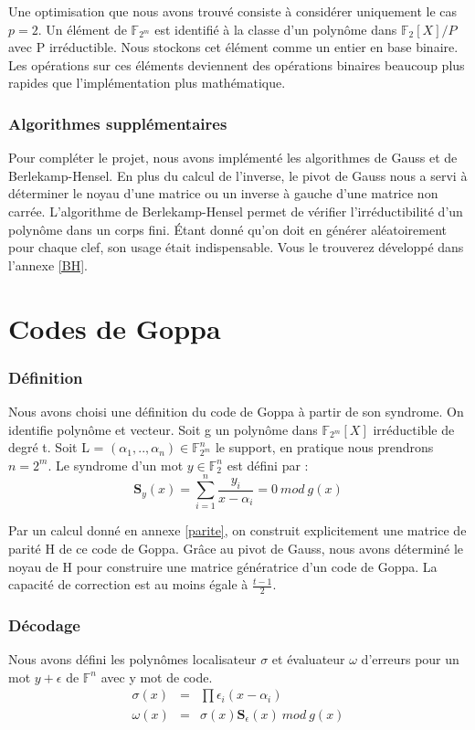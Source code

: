 \documentclass{article}
\begin{document}
			Une optimisation que nous avons trouvé consiste à considérer uniquement le cas $p = 2$.
			Un élément de $\mathbb{F}_{2^{m}}$ est identifié à la classe d'un polynôme dans $\mathbb{F}_{2}[X]/P$ avec P irréductible.
			Nous stockons cet élément comme un entier en base binaire.
			Les opérations sur ces éléments deviennent des opérations binaires beaucoup plus rapides que l'implémentation plus mathématique.

		\section*{Algorithmes supplémentaires}
			Pour compléter le projet, nous avons implémenté les algorithmes de Gauss et de Berlekamp-Hensel.
			En plus du calcul de l'inverse, le pivot de Gauss nous a servi à déterminer le noyau d'une matrice ou un inverse à gauche d'une matrice non carrée.
			L'algorithme de Berlekamp-Hensel \cite{berlekamp} permet de vérifier l'irréductibilité d'un polynôme dans un corps fini.
			Étant donné qu'on doit en générer aléatoirement pour chaque clef, son usage était indispensable.
			Vous le trouverez développé dans l'annexe \ref{BH}.

	\part*{Codes de Goppa}

		\section*{Définition}
			\cite{finiasz}
			Nous avons choisi une définition du code de Goppa à partir de son syndrome.
			On identifie polynôme et vecteur.
			Soit g un polynôme dans $\mathbb{F}_{2^{m}}[X]$ irréductible de degré t.
			Soit L = $ (\alpha_{1},..,\alpha_{n})  \in \mathbb{F}_{2^{m}}^{n}$ le support, en pratique nous prendrons $n = 2^{m}$.
			Le syndrome d'un mot $y \in \mathbb{F}_{2}^{n}$ est défini par :
			$$
				\mathbf{S}_{y}(x) = \sum_{i=1}^{n} \frac{y_{i}}{x-\alpha_{i}} = 0 \ mod \ g(x)
			$$

			Par un calcul donné en annexe \ref{parite}, on construit explicitement une matrice de parité H de ce code de Goppa.
			Grâce au pivot de Gauss, nous avons déterminé le noyau de H pour construire une matrice génératrice d'un code de Goppa.
			La capacité de correction est au moins égale à $\frac{t-1}{2}$.


		\section*{Décodage}
			Nous avons défini les polynômes localisateur $\sigma$ et évaluateur $\omega$ d'erreurs pour un mot $y + \epsilon$ de $\mathbb{F}^{n}$ avec y mot de code.
			\begin{eqnarray}
				\sigma(x) &=& \prod \epsilon_{i}(x - \alpha_{i}) \\
				\omega(x) &=& \sigma(x) \mathbf{S}_{\epsilon}(x) \ mod \ g(x)
			\end{eqnarray}
\end{document}
